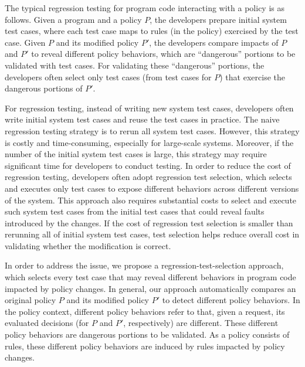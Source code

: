 The typical regression testing for program code interacting with a policy is as follows.
Given a program and a policy $P$, the developers prepare initial system test cases, where
each test case maps to rules (in the policy) exercised by the test case. Given $P$ and its modified
policy $P'$, the developers compare impacts of $P$ and $P'$ to
reveal different policy behaviors, which are ``dangerous'' portions to be validated with
test cases. For validating these ``dangerous'' portions, the developers often select only test cases (from test cases for $P$) that exercise the dangerous
portions of $P'$.

For regression testing, instead of writing new system test cases, developers often write initial system test cases and 
reuse the test cases in practice. The naive regression testing strategy is to rerun all system test cases. However,
 this strategy is costly and time-consuming, especially for large-scale systems. Moreover, if the number of the initial 
system test cases is large, this strategy may require significant time for developers to conduct testing. In order to
 reduce the cost of regression testing, developers often adopt regression test selection, which selects and executes only
 test cases to expose different behaviors across different versions of the system. This approach also requires substantial
 costs to select and execute such system test cases from the initial test cases that could reveal faults introduced by the changes. 
If the cost of regression test selection is smaller than rerunning all of initial system test cases, test selection helps reduce 
overall cost in validating whether the modification is correct. 


In order to address the issue, we propose a regression-test-selection approach, which selects every test case that may 
reveal different behaviors in program code impacted by policy changes.
In general, our approach automatically compares an original 
policy $P$ and its modified policy $P'$ to detect different policy behaviors. In the policy context, different policy 
behaviors refer to that, given a request, its evaluated decisions (for $P$ and $P'$, respectively) are different.
These different policy behaviors are dangerous portions to be validated.
As a policy consists of rules, these different policy behaviors are induced by rules impacted by policy changes.



